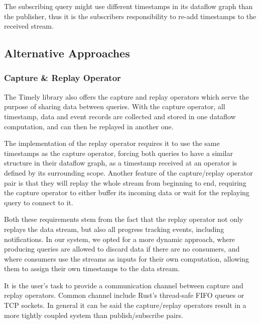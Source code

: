 The subscribing query might use different timestamps in its dataflow graph
than the publisher, thus it is the subscribers responsibility to re-add
timestamps to the received stream. 

\subsection{Alternative Approaches}

\subsubsection{Capture \& Replay Operator}

The Timely library also offers the capture and replay operators which serve the
purpose of sharing data between queries. With the capture operator, all timestamp,
data and event records are collected and stored in one dataflow computation,
and can then be replayed in another one.

The implementation of the replay operator requires it to use the same timestamps
as the capture operator, forcing both queries to have a similar structure
in their dataflow graph, as a timestamp received at an operator is defined
by its surrounding scope. Another feature of the capture/replay operator pair
is that they will replay the whole stream from beginning to end, requiring the
capture operator to either buffer its incoming data or wait for the replaying
query to connect to it. 

Both these requirements stem from the fact that the replay operator not only
replays the data stream, but also all progress tracking events, including
notifications. In our system, we opted for a more dynamic approach, where
producing queries are allowed to discard data if there are no consumers, and
where consumers use the streams as inputs for their own computation,
allowing them to assign their own timestamps to the data stream.

It is the user's task to provide a communication channel between capture and 
replay operators. Common channel include Rust's thread-safe FIFO queues or
TCP sockets. In general it can be said the capture/replay operators result
in a more tightly coupled system than publish/subscribe pairs.


